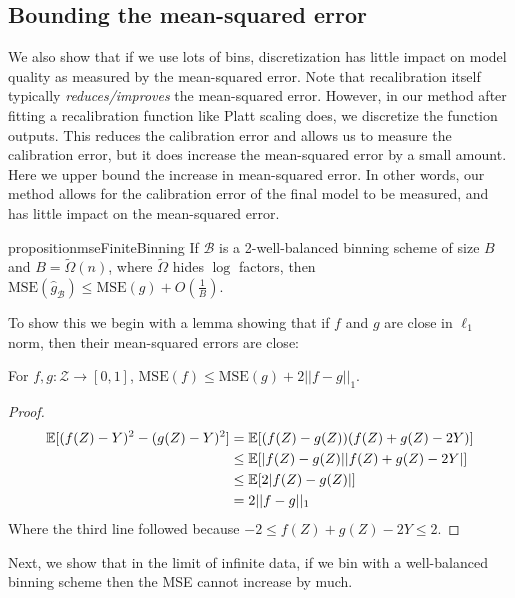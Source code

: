 \subsection{Bounding the mean-squared error}

We also show that if we use lots of bins, discretization has little impact on model quality as measured by the mean-squared error.
Note that recalibration itself typically \emph{reduces/improves} the mean-squared error.
However, in our method after fitting a recalibration function like Platt scaling does, we discretize the function outputs.
This reduces the calibration error and allows us to measure the calibration error, but it does increase the mean-squared error by a small amount.
Here we upper bound the increase in mean-squared error.
In other words, our method allows for the calibration error of the final model to be measured, and has little impact on the mean-squared error.

\begin{restatable}{proposition}{mseFiniteBinning}
\label{prop:mse-finite-binning}
If $\mathcal{B}$ is a 2-well-balanced binning scheme of size $B$ and $B = \widetilde{\Omega}(n)$, where $\widetilde{\Omega}$ hides $\log$ factors, then $\mbox{MSE}(\hat{g}_{\mathcal{B}}) \leq \mbox{MSE}(g) + O(\frac{1}{B})$.
\end{restatable}

To show this we begin with a lemma showing that if $f$ and $g$ are close in $\ell_1$ norm, then their mean-squared errors are close:

\begin{lemma}
\label{lem:mse-l1}
For $f, g : \mathcal{Z} \to [0, 1]$, $\mbox{MSE}(f) \leq \mbox{MSE}(g) + 2||f - g||_1$.
\end{lemma}

\begin{proof}
\begin{align*}
\mathbb{E}[(f(Z) - Y)^2 - (g(Z) - Y)^2] &= \mathbb{E}[(f(Z) - g(Z))(f(Z) + g(Z) - 2Y)] \\
&\leq \mathbb{E}[|f(Z) - g(Z)||f(Z) + g(Z) - 2Y|] \\
&\leq \mathbb{E}[2|f(Z) - g(Z)|] \\
& =2||f-g||_1
\end{align*}
Where the third line followed because $-2 \leq f(Z) + g(Z) - 2Y \leq 2$.
\end{proof}

Next, we show that in the limit of infinite data, if we bin with a well-balanced binning scheme then the MSE cannot increase by much.

